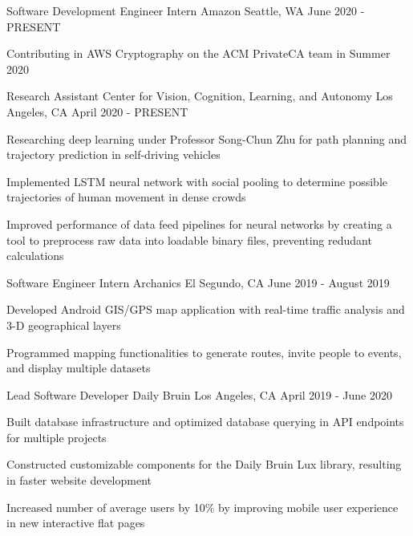 \documentclass[12pt, letterpaper]{awesome-cv}
\begin{document}
\begin{cventries}
  \cventry
    {Software Development Engineer Intern} %
    {Amazon} %
    {Seattle, WA} %
    {June 2020 - PRESENT} %
    {
      \begin{cvitems} %
        \item {Contributing in AWS Cryptography on the ACM PrivateCA team in Summer 2020}
      \end{cvitems}
    }

  \cventry
    {Research Assistant} %
    {Center for Vision, Cognition, Learning, and Autonomy} %
    {Los Angeles, CA} %
    {April 2020 - PRESENT} %
    {
      \begin{cvitems} %
        \item {Researching deep learning under Professor Song-Chun Zhu for path planning and trajectory prediction in self-driving vehicles}
        \item {Implemented LSTM neural network with social pooling to determine possible trajectories of human movement in dense crowds}
        \item {Improved performance of data feed pipelines for neural networks by creating a tool to preprocess raw data into loadable binary files, preventing redudant calculations}
      \end{cvitems}
    }

  \cventry
    {Software Engineer Intern} %
    {Archanics} %
    {El Segundo, CA} %
    {June 2019 - August 2019} %
    {
      \begin{cvitems} %
        \item {Developed Android GIS/GPS map application with real-time traffic analysis and 3-D geographical layers}
        \item {Programmed mapping functionalities to generate routes, invite people to events, and display multiple datasets}
      \end{cvitems}
    }

  \cventry
    {Lead Software Developer} %
    {Daily Bruin} %
    {Los Angeles, CA} %
    {April 2019 - June 2020} %
    {
      \begin{cvitems} %
        \item {Built database infrastructure and optimized database querying in API endpoints for multiple projects}
		    \item {Constructed customizable components for the Daily Bruin Lux library, resulting in faster website development}
		    \item {Increased number of average users by 10\% by improving mobile user experience in new interactive flat pages}
      \end{cvitems}
    }

\end{cventries}
\end{document}
